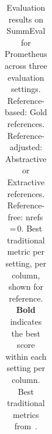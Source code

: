 \begin{table}[h]
\begin{tabular}{lccccc}
\bottomrule
\end{tabular}
\caption[Evaluation results on SummEval for Prometheus across three evaluation settings.]{%
  Evaluation results on SummEval for Prometheus across three evaluation settings.   \colorbox{refbased}{\vphantom{x} Reference-based}: Gold references.
  \colorbox{refadj}{\vphantom{x} Reference-adjusted}: Abstractive or Extractive references.
  \colorbox{reffree}{\vphantom{x} Reference-free}: nrefs\,=\,0.
Best traditional metric per setting, per column, shown for reference.  \textbf{Bold} indicates the best score within each setting per column. Best traditional metrics from~.
}
\label{tab:prometheus}
\end{table}